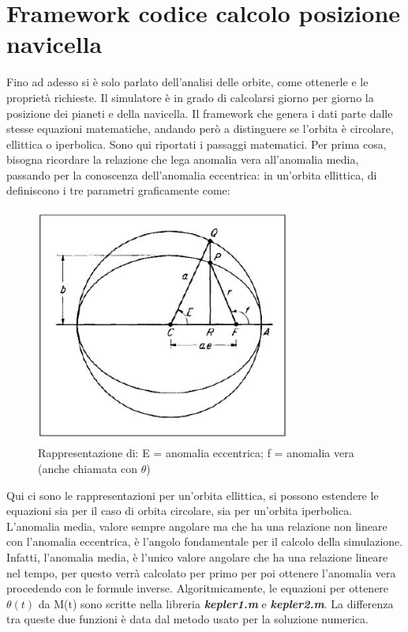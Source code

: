 \documentclass[a4paper]{article}
\begin{document}
\part{Framework codice calcolo posizione navicella}
Fino ad adesso si è solo parlato dell'analisi delle orbite, come ottenerle e le proprietà richieste. Il simulatore è in grado di calcolarsi giorno per giorno la posizione dei pianeti e della navicella. Il framework che genera i dati parte dalle stesse equazioni matematiche, andando però a distinguere se l'orbita è circolare, ellittica o iperbolica. \newline Sono qui riportati i passaggi matematici. \newline Per prima cosa, bisogna ricordare la relazione che lega anomalia vera all'anomalia media, passando per la conoscenza dell'anomalia eccentrica: \newline in un'orbita ellittica, di definiscono i tre parametri graficamente come:
\begin{figure}[h]
\includegraphics[width=0.75\textwidth]{anomalie.JPG}
\caption{Rappresentazione di: E = anomalia eccentrica; f = anomalia vera (anche chiamata con $\theta$)}
\end{figure}\newline
Qui ci sono le rappresentazioni per un'orbita ellittica, si possono estendere le equazioni sia per il caso di orbita circolare, sia per un'orbita iperbolica. L'anomalia media, valore sempre angolare ma che ha una relazione non lineare con l'anomalia eccentrica, è l'angolo fondamentale per il calcolo della simulazione. Infatti, l'anomalia media, è l'unico valore angolare che ha una relazione lineare nel tempo, per questo verrà calcolato per primo per poi ottenere l'anomalia vera procedendo con le formule inverse. Algoritmicamente, le equazioni per ottenere $\theta(t)$ da M(t) sono scritte nella libreria \textit{\textbf{kepler1.m}} e \textit{\textbf{kepler2.m}}. La differenza tra queste due funzioni è data dal metodo usato per la soluzione numerica. \newline
\end{document}
